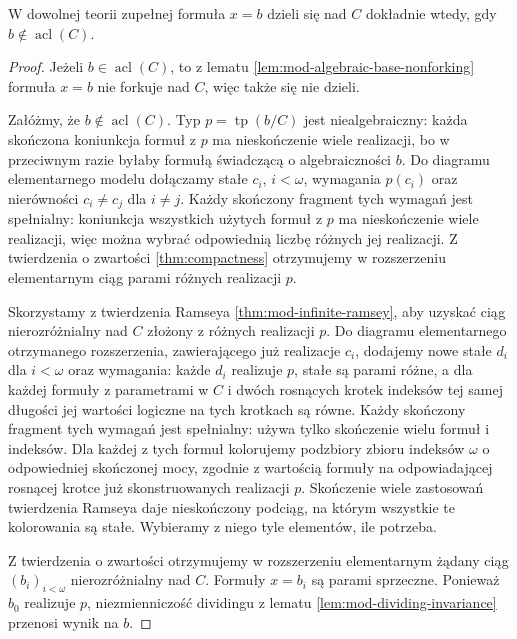 \begin{lemat}
\label{lem:mod-equality-dividing-acl}
W dowolnej teorii zupełnej formuła $x=b$
dzieli się nad $C$ dokładnie wtedy, gdy
$b\notin\operatorname{acl}(C)$.
\end{lemat}
\begin{proof}
Jeżeli $b\in\operatorname{acl}(C)$,
to z lematu \ref{lem:mod-algebraic-base-nonforking}
formuła $x=b$ nie forkuje nad $C$,
więc także się nie dzieli.

Załóżmy, że $b\notin\operatorname{acl}(C)$.
Typ $p=\operatorname{tp}(b/C)$ jest
niealgebraiczny: każda skończona koniunkcja
formuł z $p$ ma nieskończenie wiele realizacji,
bo w przeciwnym razie byłaby formułą
świadczącą o algebraiczności $b$.
Do diagramu elementarnego modelu dołączamy
stałe $c_i$, $i<\omega$, wymagania $p(c_i)$
oraz nierówności $c_i\ne c_j$ dla $i\ne j$.
Każdy skończony fragment tych wymagań jest
spełnialny: koniunkcja wszystkich użytych
formuł z $p$ ma nieskończenie wiele realizacji,
więc można wybrać odpowiednią liczbę różnych
jej realizacji. Z twierdzenia o zwartości
\ref{thm:compactness} otrzymujemy w rozszerzeniu
elementarnym ciąg parami różnych realizacji $p$.

Skorzystamy z twierdzenia Ramseya
\ref{thm:mod-infinite-ramsey}, aby uzyskać
ciąg nierozróżnialny nad $C$ złożony
z różnych realizacji $p$.
Do diagramu elementarnego otrzymanego
rozszerzenia, zawierającego już realizacje $c_i$,
dodajemy nowe stałe $d_i$ dla $i<\omega$
oraz wymagania:
każde $d_i$ realizuje $p$, stałe są
parami różne, a dla każdej formuły
z parametrami w $C$ i dwóch rosnących
krotek indeksów tej samej długości
jej wartości logiczne na tych krotkach
są równe.
Każdy skończony fragment tych wymagań
jest spełnialny: używa tylko skończenie
wielu formuł i indeksów. Dla każdej
z tych formuł kolorujemy podzbiory
zbioru indeksów $\omega$ o odpowiedniej
skończonej mocy, zgodnie z wartością
formuły na odpowiadającej rosnącej krotce
już skonstruowanych realizacji $p$.
Skończenie wiele zastosowań twierdzenia
Ramseya daje nieskończony podciąg,
na którym wszystkie te kolorowania
są stałe. Wybieramy z niego tyle
elementów, ile potrzeba.

Z twierdzenia o zwartości otrzymujemy
w rozszerzeniu elementarnym żądany ciąg
$(b_i)_{i<\omega}$ nierozróżnialny nad $C$.
Formuły $x=b_i$ są parami sprzeczne.
Ponieważ $b_0$ realizuje $p$,
niezmienniczość dividingu z lematu
\ref{lem:mod-dividing-invariance}
przenosi wynik na $b$.
\end{proof}

